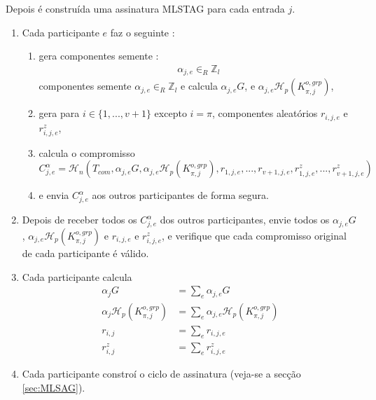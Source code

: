 Depois é construída uma assinatura MLSTAG para cada entrada $j$. 
\begin{enumerate}
    \item Cada participante $e$ faz o seguinte :
    \begin{enumerate}
        \item gera componentes semente :
\begin{align*}
\alpha_{j,e} \in_R \mathbb{Z}_l
\end{align*}
 componentes semente $\alpha_{j,e} \in_R \mathbb{Z}_l$ e calcula $\alpha_{j,e} G$, e $\alpha_{j,e} \mathcal{H}_p(K^{o,grp}_{\pi,j})$,
        \item gera para $i \in \{1,...,v+1\}$ excepto $i = \pi$, componentes aleatórios $r_{i,j,e}$ e $r^z_{i,j,e}$,
        \item calcula o compromisso
        \[C^{\alpha}_{j,e} = \mathcal{H}_n(T_{com},\alpha_{j,e} G, \alpha_{j,e} \mathcal{H}_p(K^{o,grp}_{\pi,j}),r_{1,j,e},...,r_{v+1,j,e},r^z_{1,j,e},...,r^z_{v+1,j,e})\]
        \item e envia $C^{\alpha}_{j,e}$ aos outros participantes de forma segura.
    \end{enumerate}
    \item Depois de receber todos os $C^{\alpha}_{j,e}$ dos outros participantes, envie todos os $\alpha_{j,e} G$, $\alpha_{j,e} \mathcal{H}_p(K^{o,grp}_{\pi,j})$ e $r_{i,j,e}$ e $r^z_{i,j,e}$, e verifique que cada compromisso original de cada participante é válido.  
    \item Cada participante calcula 
    \begin{align*}
        \alpha_{j} G &= \sum_e \alpha_{j,e} G\\
        \alpha_{j} \mathcal{H}_p(K^{o,grp}_{\pi,j}) &= \sum_e \alpha_{j,e} \mathcal{H}_p(K^{o,grp}_{\pi,j})\\
        r_{i,j} &= \sum_e r_{i,j,e}\\
        r^{z}_{i,j} &= \sum_e r^z_{i,j,e}
    \end{align*}{}
    \item Cada participante constroí o ciclo de assinatura (veja-se a secção \ref{sec:MLSAG}).

\end{enumerate}
